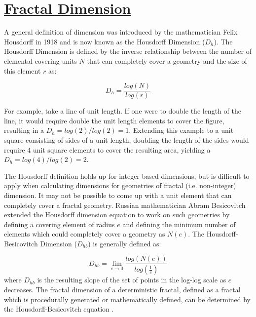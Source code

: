\documentclass[12pt, oneside]{book}
\begin{document}
\section{\underline{Fractal Dimension}}
A general definition of dimension was introduced by the mathematician Felix Housdorff in 1918 and is now known as the Housdorff Dimension (\(D_{h}\)).  The Housdorff Dimension is defined by the inverse relationship between the number of elemental covering units \(N\) that can completely cover a geometry and the size of this element \(r\) as: 

\begin{equation} \tag{1}
D_{h} = \frac{log(N)}{log(r)}
\end{equation}

For example, take a line of unit length.  If one were to double the length of the line, it would require double the unit length elements to cover the figure, resulting in a \(D_{h} = log(2)/log(2) = 1\).  Extending this example to a unit square consisting of sides of a unit length, doubling the length of the sides would require 4 unit square elements to cover the resulting area, yielding a \(D_{h} = log(4)/log(2) = 2\).  

The Housdorff definition holds up for integer-based dimensions, but is difficult to apply when calculating dimensions for geometries of fractal (i.e. non-integer) dimension.  It may not be possible to come up with a unit element that can completely cover a fractal geometry.  Russian mathematician Abram Besicovitch extended the Housdorff dimension equation to work on such geometries by defining a covering element of radius \(e\) and defining the minimum number of elements which could completely cover a geometry as \(N(e)\). The Housdorff-Besicovitch Dimension (\(D_{hb}\)) is generally defined as:

\begin{equation} \tag{2}
D_{hb} = \lim_{e \to 0} \frac{log( N(e) )}{log(\frac{1}{e})} 
\end{equation}  %
where \(D_{hb}\) is the resulting slope of the set of points in the log-log scale as \(e\)  decreases.  The fractal dimension of a deterministic fractal, defined as a fractal which is procedurally generated or mathematically defined, can be determined by the Housdorff-Besicovitch equation \cite{buczkowski_modified_1998}.
\end{document}
